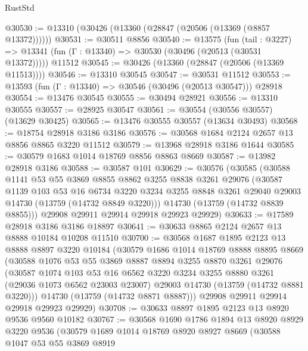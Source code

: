 \begin{lexlean}{RustStd}
\begin{coremodule}
@30530 := @13310 (@30426 (@13360 (@28847 (@20506 (@13369 (@8857 @13372))))))
@30531 := @30511 @8856
@30540 := @13575
    (fun (tail : @3227) => @13341 (fun (Γ : @13340) => @30530 (@30496 (@20513 (@30531 @13372)))))
    @11512
@30545 := @30426 (@13360 (@28847 (@20506 (@13369 @11513))))
@30546 := @13310 @30545
@30547 := @30531 @11512
@30553 := @13593 (fun (Γ : @13340) => @30546 (@30496 (@20513 @30547))) @28918
@30554 := @13476 @30545
@30555 := @30494 @28921
@30556 := @13310 @30555
@30557 := @28925 @30547
@30561 := @30554 (@30556 @30557) (@13629 @30425)
@30565 := @13476 @30555 @30557 (@13634 @30493)
@30568 := @18754 @28918 @3186 @3186
@30576 := @30568 @1684 @2124 @2657 @13 @8856 @8865 @3220 @11512
@30579 := @13968 @28918 @3186 @1644
@30585 := @30579 @1683 @1014 @18769 @8856 @8863 @8669
@30587 := @13982 @28918 @3186
@30588 := @30587 @101
@30629 := @30576
    (@30585
      (@30588
        @1141
        @53
        @55
        @3869
        @8855
        @8862
        @3255
        @8838
        @3261
        @29076
        (@30587
          @1139
          @103
          @53
          @16
          @6734
          @3220
          @3234
          @3255
          @8848
          @3261
          @29040
          @29003
          @14730
          (@13759 (@14732 @8849 @3220)))
        @14730
        (@13759 (@14732 @8839 @8855)))
      @29908
      @29911
      @29914
      @29918
      @29923
      @29929)
@30633 := @17589 @28918 @3186 @3186 @18897
@30641 := @30633 @8865 @2124 @2657 @13 @8888 @10184 @10208 @11510
@30700 := @30568
    @1687
    @1895
    @2123
    @13
    @8888
    @8897
    @3220
    @10184
    (@30579
      @1686
      @1014
      @18769
      @8888
      @8895
      @8669
      (@30588
        @1076
        @53
        @55
        @3869
        @8887
        @8894
        @3255
        @8870
        @3261
        @29076
        (@30587
          @1074
          @103
          @53
          @16
          @6562
          @3220
          @3234
          @3255
          @8880
          @3261
          (@29036 @1073 @6562 @23003 @23007)
          @29003
          @14730
          (@13759 (@14732 @8881 @3220)))
        @14730
        (@13759 (@14732 @8871 @8887)))
      @29908
      @29911
      @29914
      @29918
      @29923
      @29929)
@30708 := @30633 @8897 @1895 @2123 @13 @8920 @9536 @9560 @10182
@30767 := @30568
    @1690
    @1786
    @1894
    @13
    @8920
    @8929
    @3220
    @9536
    (@30579
      @1689
      @1014
      @18769
      @8920
      @8927
      @8669
      (@30588
        @1047
        @53
        @55
        @3869
        @8919

\end{coremodule}
\end{lexlean}
